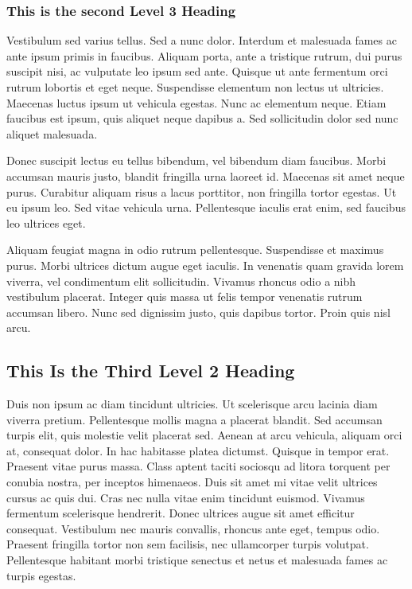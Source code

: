\subsubsection{This is the second Level 3 Heading}

Vestibulum sed varius tellus. Sed a nunc dolor. Interdum et malesuada fames ac ante ipsum primis in faucibus. Aliquam porta, ante a tristique rutrum, dui purus suscipit nisi, ac vulputate leo ipsum sed ante. Quisque ut ante fermentum orci rutrum lobortis et eget neque. Suspendisse elementum non lectus ut ultricies. Maecenas luctus ipsum ut vehicula egestas. Nunc ac elementum neque. Etiam faucibus est ipsum, quis aliquet neque dapibus a. Sed sollicitudin dolor sed nunc aliquet malesuada.

Donec suscipit lectus eu tellus bibendum, vel bibendum diam faucibus. Morbi accumsan mauris justo, blandit fringilla urna laoreet id. Maecenas sit amet neque purus. Curabitur aliquam risus a lacus porttitor, non fringilla tortor egestas. Ut eu ipsum leo. Sed vitae vehicula urna. Pellentesque iaculis erat enim, sed faucibus leo ultrices eget.

Aliquam feugiat magna in odio rutrum pellentesque. Suspendisse et maximus purus. Morbi ultrices dictum augue eget iaculis. In venenatis quam gravida lorem viverra, vel condimentum elit sollicitudin. Vivamus rhoncus odio a nibh vestibulum placerat. Integer quis massa ut felis tempor venenatis rutrum accumsan libero. Nunc sed dignissim justo, quis dapibus tortor. Proin quis nisl arcu.

\subsection{This Is the Third Level 2 Heading}

Duis non ipsum ac diam tincidunt ultricies. Ut scelerisque arcu lacinia diam viverra pretium. Pellentesque mollis magna a placerat blandit. Sed accumsan turpis elit, quis molestie velit placerat sed. Aenean at arcu vehicula, aliquam orci at, consequat dolor. In hac habitasse platea dictumst. Quisque in tempor erat. Praesent vitae purus massa. Class aptent taciti sociosqu ad litora torquent per conubia nostra, per inceptos himenaeos. Duis sit amet mi vitae velit ultrices cursus ac quis dui. Cras nec nulla vitae enim tincidunt euismod. Vivamus fermentum scelerisque hendrerit. Donec ultrices augue sit amet efficitur consequat. Vestibulum nec mauris convallis, rhoncus ante eget, tempus odio. Praesent fringilla tortor non sem facilisis, nec ullamcorper turpis volutpat. Pellentesque habitant morbi tristique senectus et netus et malesuada fames ac turpis egestas.

